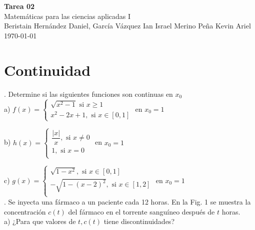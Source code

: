 \documentclass[letterpaper]{article}
\begin{document}
	\begin{titlepage}
	    \begin{center}
	        \Large{\textbf{Tarea 02}} \\[0.1cm]
	        \huge{Matemáticas para las ciencias aplicadas I}\\[0.2cm]
	        \large{ Beristain Hernández Daniel, García Vázquez Ian Israel Merino Peña Kevin Ariel }\\
	        \today
	    \end{center}
	    \let\newpage\relax%
	\end{titlepage}
\hrulefill
\section*{Continuidad}

. Determine si las siguientes funciones son continuas en $ x_{0} $\\

a) $ f(x) = \begin{cases}
\sqrt{x^{2}-1} \text{ si } x\geq 1\\
x^{2}-2x+1, \text{ si } x \in [0,1]
\end{cases} $ en $ x_{0}=1 $


b) $ h(x) =  \begin{cases}
\dfrac{|x|}{x}, \text{  si  } x \neq 0\\
1, \text{  si  } x = 0\\
\end{cases}$ en $ x_{0} = 1 $


c) $ g(x) =  \begin{cases}
\sqrt{1-x^{2}}, \text{  si  } x \in [0,1]\\
-\sqrt{1-(x-2)^{2}}, \text{  si  } x \in [1,2]\\
\end{cases}$ en $ x_{0} = 1 $\\


. Se inyecta una fármaco a un paciente cada 12 horas. En la Fig. 1 se muestra la concentración $ c(t) $ del fármaco en el torrente sanguíneo después de $ t $ horas.\\

a) ¿Para que valores de $ t, c(t) $ tiene discontinuidades?\\
\end{document}
